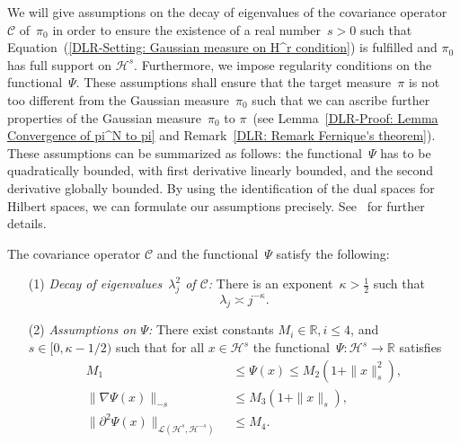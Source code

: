 We will give assumptions on the decay of eigenvalues of the covariance operator~$\mathcal{C}$ of~$\pi_0$ in order to ensure the existence of a real number~$s > 0$ such that Equation~(\ref{DLR-Setting: Gaussian measure on H^r condition}) is fulfilled and $\pi_0$ has full support on $\mathcal{H}^s$. Furthermore, we impose regularity conditions on the functional~$\Psi$. These assumptions shall ensure that the target measure~$\pi$ is not too different from the Gaussian measure~$\pi_0$ such that we can ascribe further properties of the Gaussian measure~$\pi_0$ to $\pi$~(see Lemma~\ref{DLR-Proof: Lemma Convergence of pi^N to pi} and Remark~\ref{DLR: Remark Fernique's theorem}). These assumptions can be summarized as follows: the functional~$\Psi$ has to be quadratically bounded, with first derivative linearly bounded, and the second derivative globally bounded. By using the identification of the dual spaces for Hilbert spaces, we can formulate our assumptions precisely. See~\autocite[Assumption 2.1]{Pillai2012} for further details.

\begin{assum}
 \label{DLR-Setting: Assumptions on C and Psi}
 The covariance operator $\mathcal{C}$ and the functional~$\Psi$ satisfy the following:
 \begin{enumerate} 
  \item[(1)] \textit{Decay of eigenvalues~$\lambda_j^2$ of $\mathcal{C}$: } There is an exponent~$\kappa > \tfrac{1}{2}$ such that
 \begin{equation}
 \label{DLR-Seeting: Assumption on decay of eigenvalues}
  \lambda_j \asymp j^{- \kappa}.
 \end{equation}
 \item[(2)] \textit{Assumptions on $\Psi$: } There exist constants $M_i \in \mathbb{R}, i \leq 4$, and $s \in [0, \kappa - 1/2)$ such that for all $x \in \mathcal{H}^s$ the functional~$\Psi: \mathcal{H}^s \to \mathbb{R}$ satisfies
 \begin{align}
 \label{DLR-Setting: Assumption on Psi 1}
  M_1 & \; \leq \Psi(x) \leq M_2 (1+ \| x \|_s^2), \\
  \label{DLR-Setting: Assumption on Psi 2}
  \| \nabla \Psi (x) \|_{-s} & \; \leq M_3 (1+\| x\|_s), \\
  \label{DLR-Setting: Assumption on Psi 3}
  \| \partial^2 \Psi (x) \|_{\mathcal{L}(\mathcal{H}^s, \mathcal{H}^{-s})} & \; \leq M_4.
 \end{align}
 \end{enumerate}
\end{assum}

